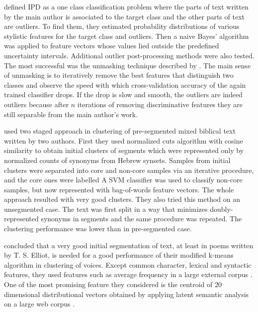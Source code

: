 \documentclass[10pt, a4paper]{article}
\begin{document}
\citet{stein-2011} defined IPD as a one class classification problem where the parts of text written by the main author is associated to the target class and the other parts of text are outliers. To find them, they estimated probability distributions of various stylistic features for the target class and outliers. Then a naive Bayes' algorithm was applied to feature vectors whose values lied outside the predefined uncertainty intervals. Additional outlier post-processing methods were also tested. The most successful was the unmasking technique described by \citet{koppel-2009}. The main sense of unmasking is to iteratively remove the best features that distinguish two classes and observe the speed with which cross-validation accuracy of the again trained classifier drops. If the drop is slow and smooth, the outliers are indeed outliers because after $n$ iterations of removing discriminative features they are still separable from the main author's work.

\citet{koppel-2011} used two staged approach in clustering of pre-segmented mixed biblical text written by two authors. First they used normalized cuts algorithm with cosine similarity to obtain initial clusters of segments which were represented only by normalized counts of synonyms from Hebrew synsets. Samples from initial clusters were separated into core and non-core samples via an iterative procedure, and the core ones were labelled A SVM classifier was used to classify non-core samples, but now represented with bag-of-words feature vectors. The whole approach resulted with very good clusters. They also tried this method on an unsegmented case. The text was first split in a way that minimizes doubly-represented synonyms in segments and the same procedure was repeated. The clustering performance was lower than in pre-segmented case.

\citet{brooke-2013} concluded that a very good initial segmentation of text, at least in poems written by T. S. Elliot, is needed for a good performance of their modified k-means algorithm in clustering of voices. Except common character, lexical and syntactic features, they used features such as average frequency in a large  external corpus \citep{brants-2006}. One of the most promising feature they considered is the centroid of $20$ dimensional distributional vectors obtained by applying latent semantic analysis on a large web corpus \cite{landauer-1997}.
\end{document}
